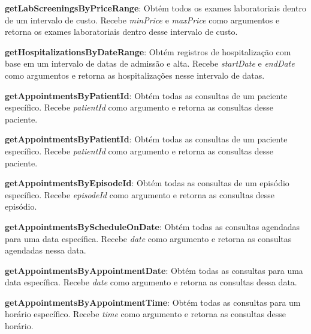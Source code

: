 \vspace{0.15cm}

\textbf{getLabScreeningsByPriceRange}: Obtém todos os exames laboratoriais dentro de um intervalo de custo. Recebe \textit{minPrice} e \textit{maxPrice} como argumentos e retorna os exames laboratoriais dentro desse intervalo de custo.

\vspace{0.15cm}

\textbf{getHospitalizationsByDateRange}: Obtém registros de hospitalização com base em um intervalo de datas de admissão e alta. Recebe \textit{startDate} e \textit{endDate} como argumentos e retorna as hospitalizações nesse intervalo de datas.

\vspace{0.15cm}

\textbf{getAppointmentsByPatientId}: Obtém todas as consultas de um paciente específico. Recebe \textit{patientId} como argumento e retorna as consultas desse paciente.

\vspace{0.15cm}

\textbf{getAppointmentsByPatientId}: Obtém todas as consultas de um paciente específico. Recebe \textit{patientId} como argumento e retorna as consultas desse paciente.

\vspace{0.15cm}

\textbf{getAppointmentsByEpisodeId}: Obtém todas as consultas de um episódio específico. Recebe \textit{episodeId} como argumento e retorna as consultas desse episódio.

\vspace{0.15cm}

\textbf{getAppointmentsByScheduleOnDate}: Obtém todas as consultas agendadas para uma data específica. Recebe \textit{date} como argumento e retorna as consultas agendadas nessa data.

\vspace{0.15cm}

\textbf{getAppointmentsByAppointmentDate}: Obtém todas as consultas para uma data específica. Recebe \textit{date} como argumento e retorna as consultas dessa data.

\vspace{0.15cm}

\textbf{getAppointmentsByAppointmentTime}: Obtém todas as consultas para um horário específico. Recebe \textit{time} como argumento e retorna as consultas desse horário.

